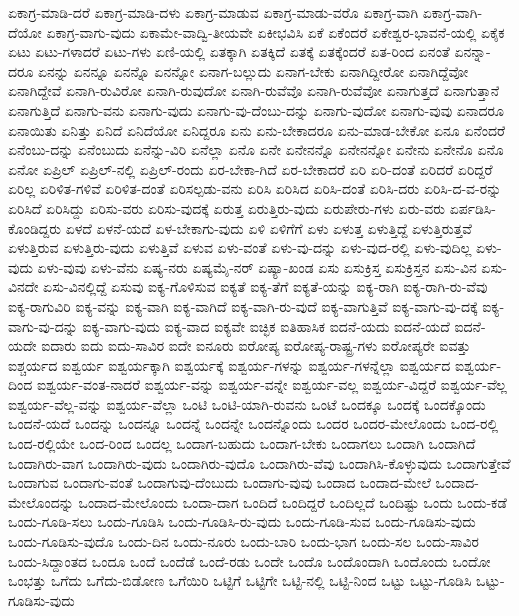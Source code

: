 {ಏಕಾಗ್ರ-ಮಾಡಿ-ದರೆ
ಏಕಾಗ್ರ-ಮಾಡಿ-ದಳು
ಏಕಾಗ್ರ-ಮಾಡುವ
ಏಕಾಗ್ರ-ಮಾಡು-ವರೊ
ಏಕಾಗ್ರ-ವಾಗಿ
ಏಕಾಗ್ರ-ವಾಗಿ-ದೆಯೋ
ಏಕಾಗ್ರ-ವಾಗು-ವುದು
ಏಕಾಮೇ-ವಾದ್ವಿ-ತೀಯವೇ
ಏಕೀಭವಿಸಿ
ಏಕೆ
ಏಕೆಂದರೆ
ಏಕೇಶ್ವರ-ಭಾವನೆ-ಯಲ್ಲಿ
ಏಕೈಕ
ಏಟು
ಏಟು-ಗಳಾದರೆ
ಏಟು-ಗಳು
ಏಣಿ-ಯಲ್ಲಿ
ಏತಕ್ಕಾಗಿ
ಏತಕ್ಕಿದೆ
ಏತಕ್ಕೆ
ಏತಕ್ಕೆಂದರೆ
ಏತ-ರಿಂದ
ಏನಂತೆ
ಏನನ್ನಾ-ದರೂ
ಏನನ್ನು
ಏನನ್ನೂ
ಏನನ್ನೊ
ಏನನ್ನೋ
ಏನಾಗ-ಬಲ್ಲುದು
ಏನಾಗ-ಬೇಕು
ಏನಾಗಿದ್ದೀರೋ
ಏನಾಗಿದ್ದೆವೋ
ಏನಾಗಿದ್ದೇವೆ
ಏನಾಗಿ-ರುವಿರೋ
ಏನಾಗಿ-ರುವುದೋ
ಏನಾಗಿ-ರುವೆವೊ
ಏನಾಗಿ-ರುವೆವೋ
ಏನಾಗುತ್ತದೆ
ಏನಾಗುತ್ತಾನೆ
ಏನಾಗುತ್ತಿದೆ
ಏನಾಗು-ವನು
ಏನಾಗು-ವುದು
ಏನಾಗು-ವು-ದೆಂಬು-ದನ್ನು
ಏನಾಗು-ವುದೋ
ಏನಾಗು-ವುವು
ಏನಾದರೂ
ಏನಾಯಿತು
ಏನಿತ್ತು
ಏನಿದೆ
ಏನಿದೆಯೋ
ಏನಿದ್ದರೂ
ಏನು
ಏನು-ಬೇಕಾದರೂ
ಏನು-ಮಾಡ-ಬೇಕೋ
ಏನೂ
ಏನೆಂದರೆ
ಏನೆಂಬು-ದನ್ನು
ಏನೆಂಬುದು
ಏನೆನ್ನು-ವಿರಿ
ಏನೆಲ್ಲಾ
ಏನೊ
ಏನೇ
ಏನೇನನ್ನೊ
ಏನೇನನ್ನೋ
ಏನೇನು
ಏನೇನೊ
ಏನೊ
ಏನೋ
ಏಪ್ರಿಲ್
ಏಪ್ರಿಲ್-ನಲ್ಲಿ
ಏಪ್ರಿಲ್-ರಂದು
ಏರ-ಬೇಕಾ-ಗಿದೆ
ಏರ-ಬೇಕಾದರೆ
ಏರಿ
ಏರಿ-ದಂತೆ
ಏರಿದರೆ
ಏರಿದ್ದರೆ
ಏರಿಲ್ಲ
ಏರಿಳಿತ-ಗಳಿವೆ
ಏರಿಳಿತ-ದಂತೆ
ಏರಿಸಲ್ಪಡು-ವನು
ಏರಿಸಿ
ಏರಿಸಿದ
ಏರಿಸಿ-ದಂತೆ
ಏರಿಸಿ-ದರು
ಏರಿಸಿ-ದ-ವ-ರನ್ನು
ಏರಿಸಿದೆ
ಏರಿಸಿದ್ದು
ಏರಿಸು-ವರು
ಏರಿಸು-ವುದಕ್ಕೆ
ಏರುತ್ತ
ಏರುತ್ತಿರು-ವುದು
ಏರುಪೇರು-ಗಳು
ಏರು-ವರು
ಏರ್ಪಡಿಸಿ-ಕೊಂಡಿದ್ದರು
ಏಳದೆ
ಏಳನೆ-ಯದೆ
ಏಳ-ಬೇಕಾಗು-ವುದು
ಏಳಿ
ಏಳಿಗೆಗೆ
ಏಳು
ಏಳುತ್ತ
ಏಳುತ್ತಿದ್ದೆ
ಏಳುತ್ತಿರುತ್ತವೆ
ಏಳುತ್ತಿರುವ
ಏಳುತ್ತಿರು-ವುದು
ಏಳುತ್ತಿವೆ
ಏಳುವ
ಏಳು-ವಂತೆ
ಏಳು-ವು-ದನ್ನು
ಏಳು-ವುದ-ರಲ್ಲಿ
ಏಳು-ವುದಿಲ್ಲ
ಏಳು-ವುದು
ಏಳು-ವುವು
ಏಳು-ವೆನು
ಏಷ್ಯ-ನರು
ಏಷ್ಯಮೈ-ನರ್
ಏಷ್ಯಾ-ಖಂಡ
ಏಸು
ಏಸುಕ್ರಿಸ್ತ
ಏಸುಕ್ರಿಸ್ತನ
ಏಸು-ವಿನ
ಏಸು-ವಿನದೇ
ಏಸು-ವಿನಲ್ಲಿದ್ದೆ
ಏಸುವು
ಐಕ್ಯ-ಗೊಳಿಸುವ
ಐಕ್ಯತೆ
ಐಕ್ಯ-ತೆಗೆ
ಐಕ್ಯತೆ-ಯನ್ನು
ಐಕ್ಯ-ರಾಗಿ
ಐಕ್ಯ-ರಾಗಿ-ರು-ವೆವು
ಐಕ್ಯ-ರಾಗುವಿರಿ
ಐಕ್ಯ-ವನ್ನು
ಐಕ್ಯ-ವಾಗಿ
ಐಕ್ಯ-ವಾಗಿದೆ
ಐಕ್ಯ-ವಾಗಿ-ರು-ವುದೆ
ಐಕ್ಯ-ವಾಗುತ್ತಿವೆ
ಐಕ್ಯ-ವಾಗು-ವು-ದಕ್ಕೆ
ಐಕ್ಯ-ವಾಗು-ವು-ದನ್ನು
ಐಕ್ಯ-ವಾಗು-ವುದು
ಐಕ್ಯ-ವಾದ
ಐಕ್ಯವೇ
ಐಚ್ಛಿಕ
ಐತಿಹಾಸಿಕ
ಐದನೆ-ಯದು
ಐದನೆ-ಯದೆ
ಐದನೆ-ಯದೇ
ಐದಾರು
ಐದು
ಐದು-ಸಾವಿರ
ಐದೇ
ಐನೂರು
ಐರೋಪ್ಯ
ಐರೋಪ್ಯ-ರಾಷ್ಟ್ರ-ಗಳು
ಐರೋಪ್ಯರೇ
ಐವತ್ತು
ಐಶ್ಚರ್ಯದ
ಐಶ್ವರ್ಯ
ಐಶ್ವರ್ಯಕ್ಕಾಗಿ
ಐಶ್ವರ್ಯಕ್ಕೆ
ಐಶ್ವರ್ಯ-ಗಳನ್ನು
ಐಶ್ವರ್ಯ-ಗಳನ್ನೆಲ್ಲಾ
ಐಶ್ವರ್ಯದ
ಐಶ್ವರ್ಯ-ದಿಂದ
ಐಶ್ವರ್ಯ-ವಂತ-ನಾದರೆ
ಐಶ್ವರ್ಯ-ವನ್ನು
ಐಶ್ವರ್ಯ-ವನ್ನೇ
ಐಶ್ವರ್ಯ-ವಲ್ಲ
ಐಶ್ವರ್ಯ-ವಿದ್ದರೆ
ಐಶ್ವರ್ಯ-ವೆಲ್ಲ
ಐಶ್ವರ್ಯ-ವೆಲ್ಲ-ವನ್ನು
ಐಶ್ವರ್ಯ-ವೆಲ್ಲಾ
ಒಂಟಿ
ಒಂಟಿ-ಯಾಗಿ-ರುವನು
ಒಂಟೆ
ಒಂದಕ್ಕೂ
ಒಂದಕ್ಕೆ
ಒಂದಕ್ಕೊಂದು
ಒಂದನೆ-ಯದೆ
ಒಂದನ್ನು
ಒಂದನ್ನೂ
ಒಂದನ್ನೆ
ಒಂದನ್ನೇ
ಒಂದನ್ನೊಂದು
ಒಂದರ
ಒಂದರ-ಮೇಲೊಂದು
ಒಂದ-ರಲ್ಲಿ
ಒಂದ-ರಲ್ಲಿಯೇ
ಒಂದ-ರಿಂದ
ಒಂದಲ್ಲ
ಒಂದಾಗ-ಬಹುದು
ಒಂದಾಗ-ಬೇಕು
ಒಂದಾಗಲು
ಒಂದಾಗಿ
ಒಂದಾಗಿದೆ
ಒಂದಾಗಿರು-ವಾಗ
ಒಂದಾಗಿರು-ವುದು
ಒಂದಾಗಿರು-ವುದೊ
ಒಂದಾಗಿರು-ವೆವು
ಒಂದಾಗಿಸಿ-ಕೊಳ್ಳುವುದು
ಒಂದಾಗುತ್ತೇವೆ
ಒಂದಾಗುವ
ಒಂದಾಗು-ವಂತೆ
ಒಂದಾಗುವು-ದೆಂಬುದು
ಒಂದಾಗು-ವುವು
ಒಂದಾದ
ಒಂದಾದ-ಮೇಲೆ
ಒಂದಾದ-ಮೇಲೊಂದನ್ನು
ಒಂದಾದ-ಮೇಲೊಂದು
ಒಂದಾ-ದಾಗ
ಒಂದಿದೆ
ಒಂದಿದ್ದರೆ
ಒಂದಿಲ್ಲದೆ
ಒಂದಿಷ್ಟು
ಒಂದು
ಒಂದು-ಕಡೆ
ಒಂದು-ಗೂಡಿ-ಸಲು
ಒಂದು-ಗೂಡಿಸಿ
ಒಂದು-ಗೂಡಿಸಿ-ರು-ವುದು
ಒಂದು-ಗೂಡಿ-ಸುವ
ಒಂದು-ಗೂಡಿಸು-ವುದು
ಒಂದು-ಗೂಡಿಸು-ವುದೊ
ಒಂದು-ದಿನ
ಒಂದು-ನೂರು
ಒಂದು-ಬಾರಿ
ಒಂದು-ಭಾಗ
ಒಂದು-ಸಲ
ಒಂದು-ಸಾವಿರ
ಒಂದು-ಸಿದ್ದಾಂತದ
ಒಂದೂ
ಒಂದೆ
ಒಂದೆಡೆ
ಒಂದೆ-ರಡು
ಒಂದೇ
ಒಂದೊ
ಒಂದೊಂದಾಗಿ
ಒಂದೊಂದು
ಒಂದೋ
ಒಂಭತ್ತು
ಒಗೆದು
ಒಗೆದು-ಬಿಡೋಣ
ಒಗೆಯಿರಿ
ಒಟ್ಟಿಗೆ
ಒಟ್ಟಿಗೇ
ಒಟ್ಟಿ-ನಲ್ಲಿ
ಒಟ್ಟಿ-ನಿಂದ
ಒಟ್ಟು
ಒಟ್ಟು-ಗೂಡಿಸಿ
ಒಟ್ಟು-ಗೂಡಿಸು-ವುದು
}
